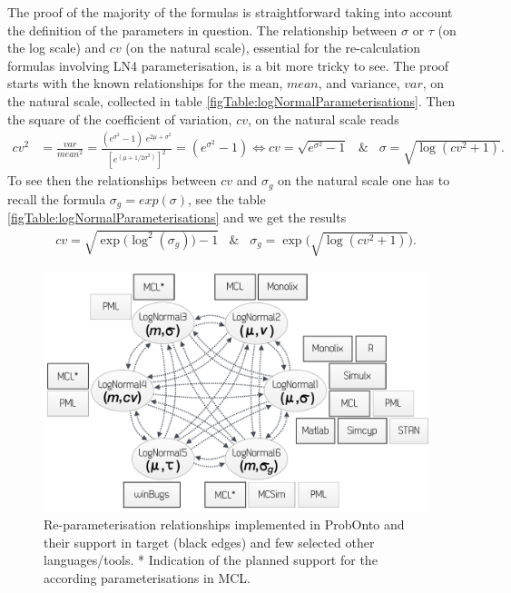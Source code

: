 {The proof of the majority of the formulas is straightforward taking into account the definition
of the parameters in question. The relationship between $\sigma$ or $\tau$ (on the log scale) 
and $cv$ (on the natural scale), essential for the re-calculation formulas involving
LN4 parameterisation, is a bit more tricky to see. The 
proof starts with the known relationships for the mean, $mean$, and variance, $var$, on the natural 
scale, collected in table \ref{figTable:logNormalParameterisations}. 
Then the square of the coefficient of variation, $cv$, on the natural scale reads
\begin{align}
	cv^2 &= \frac{var}{mean^2} = \frac{(e^{\sigma^2}-1)\; e^{2\mu + \sigma^2}}{[e^{(\mu + 1/2\sigma^2)}]^2}
	= (e^{\sigma^2}-1) \Leftrightarrow cv = \sqrt{e^{\sigma^2}-1} \;\;\; \& \;\;\; \sigma=\sqrt{\log(cv^2 + 1)}. \nonumber
\end{align}
To see then the relationships between $cv$ and $\sigma_g$ on the natural scale 
one has to recall the formula $\sigma_g = exp(\sigma)$, see the 
table \ref{figTable:logNormalParameterisations} and we get the results
\begin{align}
	cv=\sqrt{\exp\!\big(\log^2(\sigma_g)\big) -1} \;\;\; \& \;\;\; \sigma_g=\exp\!\big(\sqrt{\log(cv^2+1)}\big) .\nonumber
\end{align}

\begin{figure}[htb!]
\centering
 \includegraphics[width=145mm]{pics/LNreparams}
\caption{Re-parameterisation relationships implemented in ProbOnto and their support 
in target (black edges) and few selected other languages/tools. * Indication of the 
planned support for the according parameterisations in MCL.}
\label{fig:LNreparams}
\end{figure}

}
